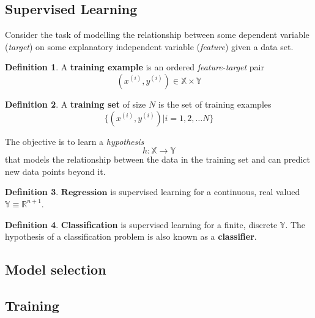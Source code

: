\documentclass{article}
\theoremstyle{definition}
\newtheorem{definition}{Definition}[section]
\theoremstyle{remark}
\begin{document}
\subsection{Supervised Learning}
Consider the task of modelling the relationship between some dependent variable (\textit{target}) on some explanatory independent variable (\textit{feature}) given a data set.
\begin{definition}
A \textbf{training example} is an ordered \textit{feature-target} pair 
    \begin{equation}
    (x^{(i)}, y^{(i)}) \in \mathbb{X} \times \mathbb{Y}
    \end{equation}
\end{definition}
\begin{definition}
A \textbf{training set} of size $N$ is the set of training examples 
\begin{equation}
    \{(x^{(i)}, y^{(i)})| i = 1, 2, \dots N\}
\end{equation}
\end{definition}
The objective is to learn a \textit{hypothesis}
\begin{equation}
    h : \mathbb{X} \rightarrow \mathbb{Y}
\end{equation}
that models the relationship between the data in the training set and can predict new data points beyond it.
\begin{definition}
$\mathbf{Regression}$ is supervised learning for a continuous, real valued $\mathbb{Y} \equiv \mathbb{R}^{n+1}$.
\end{definition}
\begin{definition}
\textbf{Classification} is supervised learning for a finite, discrete $\mathbb{Y}$. The hypothesis of a classification problem is also known as a \textbf{classifier}.
\end{definition}

\subsection{Model selection}
\subsection{Training}
\end{document}
